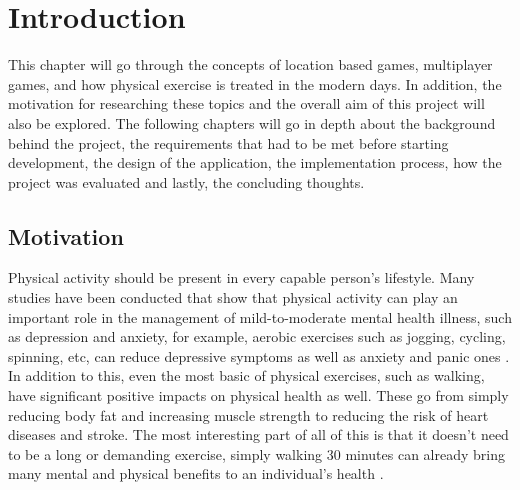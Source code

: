 \documentclass{dissertation}
\begin{document}
\def\consentname {Pedro Henrique de Castro e Melo Carvalho}
\def\consentdate{12 April 2021}

\educationalconsent


\tableofcontents


\chapter{Introduction}


This chapter will go through the concepts of location based games, multiplayer games, and how physical 
exercise is treated in the modern days. In addition, the motivation for researching these topics and the 
overall aim of this project will also be explored. The following chapters will go in depth about the background 
behind the project, the requirements that had to be met before starting development, the design of the application, 
the implementation process, how the project was evaluated and lastly, the concluding thoughts.

\section{Motivation}

Physical activity should be present in every capable person's lifestyle. Many studies have been conducted that show 
that physical activity can play an important role in the management of mild-to-moderate mental health illness, such as 
depression and anxiety, for example, aerobic exercises such as jogging, cycling, spinning, etc, can reduce depressive 
symptoms as well as anxiety and panic ones \citep{Paluska12}. In addition to this, even the most basic of physical exercises, 
such as walking, have significant positive impacts on physical health as well. These go from simply reducing body fat and 
increasing muscle strength to reducing the risk of heart diseases and stroke. The most interesting part of all of this is 
that it doesn't need to be a long or demanding exercise, simply walking 30 minutes can already bring many mental and 
physical benefits to an individual's health \citep{Harvard10}.
\end{document}
